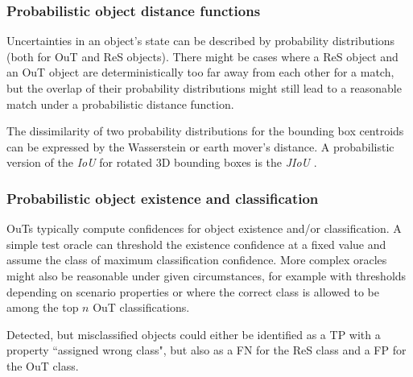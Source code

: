\documentclass[conference]{IEEEtran}
\begin{document}
\subsubsection{Probabilistic object distance functions}
\label{sec:prob_bbox}
Uncertainties in an object's state can be described by probability distributions (both for OuT and ReS objects). 
There might be cases where a ReS object and an OuT object are deterministically too far away from each other for a match, but the overlap of their probability distributions might still lead to a reasonable match under a probabilistic distance function.

The dissimilarity of two probability distributions for the bounding box centroids can be expressed by the Wasserstein or earth mover's distance.
A probabilistic version of the \textit{IoU} for rotated 3D bounding boxes is the \textit{JIoU} \cite{Wang2020inferring_iros}.

\subsubsection{Probabilistic object existence and classification}
\label{sec:prob_thresholding}


OuTs typically compute confidences for object existence and/or classification.
A simple test oracle can threshold the existence confidence at a fixed value and assume the class of maximum classification confidence.
More complex oracles might also be reasonable under given circumstances, for example with thresholds depending on scenario properties or where the correct class is allowed to be among the top $n$ OuT classifications. 

Detected, but misclassified objects could either be identified as a TP with a property ``assigned wrong class", but also as a FN for the ReS class and a FP for the OuT class.
\end{document}
